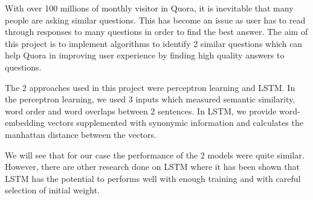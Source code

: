 \par With over 100 millions of monthly visitor in Quora, it is inevitable that many people are asking similar questions. This has become an issue as user has to read through responses to many questions in order to find the best answer. The aim of this project is to implement algorithms to identify 2 similar questions which can help Quora in improving user experience by finding high quality answers to questions.

\par The 2 approaches used in this project were perceptron learning and LSTM. In the perceptron learning, we used 3 inputs which measured semantic similarity, word order and word overlaps between 2 sentences. In LSTM, we provide word-embedding vectors supplemented with synonymic information and calculates the manhattan distance between the vectors.

\par We will see that for our case the performance of the 2 models were quite similar. However, there are other research done on LSTM where it has been shown that LSTM has the potential to performs well with enough training and with careful selection of initial weight.